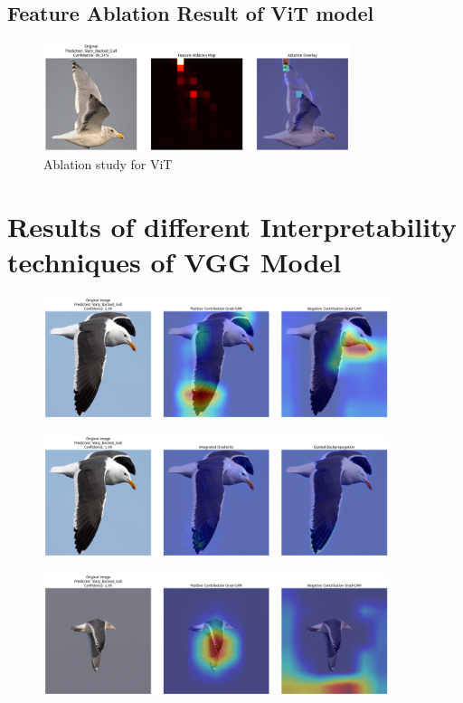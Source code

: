 \documentclass[a4paper,12pt]{report}
\begin{document}
\subsection{Feature Ablation Result of ViT model}
\begin{figure}[H]
    \centering
    \includegraphics[width=0.8\textwidth]{images/appendix/ablationvit.png}
    \caption{Ablation study for ViT}
    \label{fig:ablationvit}
\end{figure}

\section{Results of different Interpretability techniques of VGG Model}

\begin{figure}[H]
    \centering
    \includegraphics[width=0.9\textwidth]{images/appendix/vggcombined/download.png}
\end{figure}

\begin{figure}[H]
    \centering
    \includegraphics[width=0.9\textwidth]{images/appendix/vggcombined/download12.png}
\end{figure}

\begin{figure}[H]
    \centering
    \includegraphics[width=0.9\textwidth]{images/appendix/vggcombined/download (1).png}
\end{figure}
\end{document}
